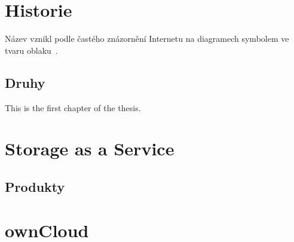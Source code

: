 


\section{Historie}
Název vznikl podle častého znázornění Internetu na diagramech symbolem ve tvaru oblaku~\cite{defCloud2}. 



\subsection{Druhy}
This is the first chapter of the thesis.

\section{Storage as a Service}

\subsection{Produkty}

\section{ownCloud}